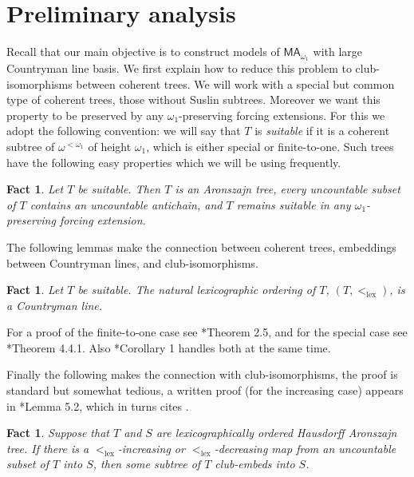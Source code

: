 \documentclass[10pt,a4paper]{amsart}
\newtheorem{fact}[theorem]{Fact}
\theoremstyle{definition}
\newcommand{\MA}{\textsf{MA}}
\newcommand{\1}{\mathbf{1}}
\DeclareMathOperator{\lex}{lex}
\begin{document}
\section{Preliminary analysis}

Recall that our main objective is to construct models of
$\MA_{\omega_{1}}$ with large Countryman line basis. We first explain
how to reduce this problem to club-isomorphisms between coherent
trees.  We will work with a special but common type of coherent trees,
those without Suslin subtrees. Moreover we want this property to be
preserved by any $\omega_{1}$-preserving forcing extensions. For this
we adopt the following convention: we will say that $T$ is
\emph{suitable} if it is a coherent subtree of $\omega^{<\omega_{1}}$ of
height $\omega_{1}$,
which is either special or finite-to-one.
Such trees have the following easy properties which we will be using
frequently.

\begin{fact}
  Let $T$ be suitable. Then $T$ is an Aronszajn tree, every uncountable
  subset of $T$ contains an uncountable antichain, and $T$ remains
  suitable in any $\omega_{1}$-preserving forcing extension.
\end{fact}

The following lemmas make the connection between coherent trees,
embeddings between Countryman lines, and club-isomorphisms.

\begin{fact}
  Let $T$ be suitable. The natural lexicographic ordering
  of $T$, $(T,<_{\lex})$, is a Countryman line.
\end{fact}

For a proof of the finite-to-one case see
\cite{TodorcevicCoherentSeqs}*{Theorem 2.5}, and for
the special case see \cite{TodorcevicWalks}*{Theorem 4.4.1}.
Also \cite{Peng2017}*{Corollary 1} handles both at the same time.

Finally the following makes the connection with club-isomorphisms,
the proof is standard but somewhat tedious, a written proof (for the increasing
case) appears in \cite{Shalev2024}*{Lemma 5.2}, which in turns
cites \cite{PengThesis}.

\begin{fact}\label{lem:club-iso-embedding}
  Suppose that $T$ and $S$ are lexicographically ordered
  Hausdorff Aronszajn tree. If there is
  a $<_{\lex}$-increasing or $<_{\lex}$-decreasing map from
  an uncountable subset of $T$ into $S$, then some
  subtree of $T$ club-embeds into $S$.
\end{fact}
\end{document}
